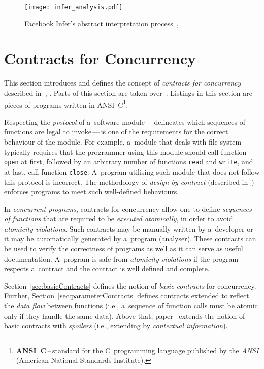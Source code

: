 \begin{figure}[hbt]
    \centering
    \texttt{[image: infer\_analysis.pdf]}
    \caption{
        Facebook Infer's abstract interpretation
        process~\cite{inferAISlides}, \cite{projectPracticeMarcin2018}
    }
    \label{fig:inferAnalysis}
\end{figure}


\section{Contracts for Concurrency}
\label{sec:contracts}

This section introduces and defines the concept of \emph{contracts for
concurrency} described in~\cite{contracts2015}, \cite{contracts2017}. Parts
of this section are taken over~\cite{excel2019FBInfer}. Listings in this
section are pieces of programs written in ANSI~C\footnote{
\textbf{ANSI~C}\,--\,standard for the C~programming language published by
the \emph{ANSI} (American National Standards Institute).}.

Respecting the \emph{protocol} of a~software module\,---\,delineates
which sequences of functions are legal to invoke\,---\,is one of the
requirements for the correct behaviour of the module. For example, a~module
that deals with file system typically requires that the programmer using
this module should call function \texttt{open} at first, followed by an
arbitrary number of functions \texttt{read} and \texttt{write}, and at last,
call function \texttt{close}. A~program utilising such module that does
not follow this protocol is incorrect. The methodology of \emph{design by
contract} (described in~\cite{contract}) enforces programs to meet
such well-defined behaviours.~\cite{contracts2015}

In \emph{concurrent programs}, contracts for concurrency allow one to define
\emph{sequences of functions} that are required to be \emph{executed
atomically}, in order to avoid \emph{atomicity violations}. Such contracts
may be manually written by a~developer or it may be automatically generated
by a~program (analyser). These contracts can be used to verify the correctness
of programs as well as it can serve as useful documentation. A~program is
safe from \emph{atomicity violations} if the program respects a~contract and
the contract is well defined and complete.

Section~\ref{sec:basicContracts} defines the notion of \emph{basic contracts}
for concurrency. Further, Section~\ref{sec:parameterContracts} defines
contracts extended to reflect the \emph{data flow} between functions (i.e.,
a~sequence of function calls must be atomic only if they handle the
same data). Above that, paper~\cite{contracts2017} extends the notion
of basic contracts with \emph{spoilers} (i.e., extending by
\emph{contextual information}).


